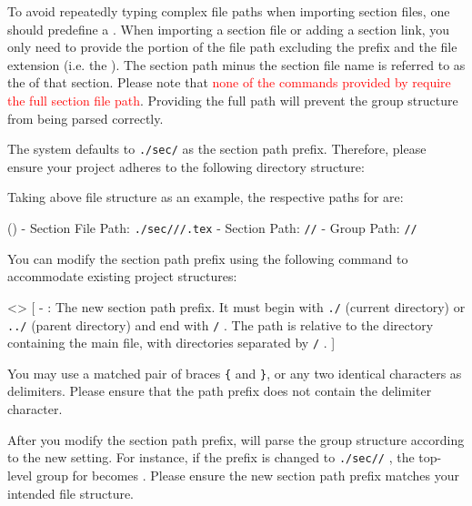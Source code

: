 
To avoid repeatedly typing complex file paths when importing section files, one should predefine a . When importing a section file or adding a section link, you only need to provide the portion of the file path excluding the prefix and the file extension (i.e. the ). The section path minus the section file name is referred to as the  of that section. Please note that \textcolor{red}{none of the commands provided by \SimpleSystemTeX require the full section file path}. Providing the full path will prevent the group structure from being parsed correctly.

The system defaults to \texttt{./sec/} as the section path prefix. Therefore, please ensure your project adheres to the following directory structure:

\medskip{}\medskip

Taking above file structure as an example, the respective paths for  are:

(){
    - Section File Path: \texttt{./sec///.tex}
    - Section Path: \texttt{//}
    - Group Path: \texttt{//}
}

You can modify the section path prefix using the following command to accommodate existing project structures:

<>{
}[
    -  : The new section path prefix. It must begin with \texttt{./} (current directory) or \texttt{../} (parent directory) and end with \texttt{/} . The path is relative to the directory containing the main file, with directories separated by \texttt{/} .
]

You may use a matched pair of braces \texttt{\{} and \texttt{\}}, or any two identical characters as delimiters. Please ensure that the path prefix does not contain the delimiter character.

After you modify the section path prefix, \SimpleSystemTeX will parse the group structure according to the new setting. For instance, if the prefix is changed to \texttt{./sec//} , the top-level group for  becomes  . Please ensure the new section path prefix matches your intended file structure.

